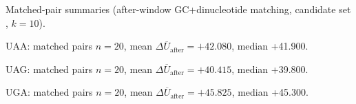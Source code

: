 Matched-pair summaries (after-window GC+dinucleotide matching, candidate set , $k=10$).

UAA: matched pairs $n=20$, mean $\Delta\overline{U}_{\mathrm{after}}=+42.080$, median +41.900.

UAG: matched pairs $n=20$, mean $\Delta\overline{U}_{\mathrm{after}}=+40.415$, median +39.800.

UGA: matched pairs $n=20$, mean $\Delta\overline{U}_{\mathrm{after}}=+45.825$, median +45.300.
